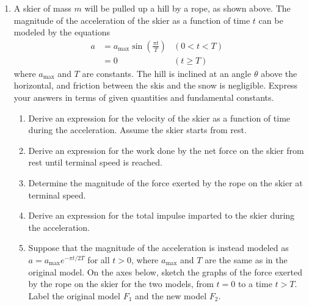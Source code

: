 \documentclass{../../../oss-apphys}
\begin{document}
\begin{center}
  \end{center}
\begin{enumerate}[leftmargin=15pt]
\item A skier of mass $m$ will be pulled up a hill by a rope, as shown above.
  The magnitude of the acceleration of the skier as a function of time $t$ can
  be modeled by the equations
  \begin{align*}
    a &=a_{\text{max}}\sin\left(\frac{\pi t}{T}\right)  &(0<t<T)&\\
    &=0 & (t\geq T)&
  \end{align*}
  where $a_{\text{max}}$ and $T$ are constants. The hill is inclined at an angle
  $\theta$ above the horizontal, and friction between the skis and the snow is
  negligible. Express your answers in terms of given quantities and fundamental
  constants.
  \begin{enumerate}[leftmargin=15pt]
  \item  Derive an expression for the velocity of the skier as a function of
    time during the acceleration. Assume the skier starts from rest.
    \vspace{1.2in}
  \item Derive an expression for the work done by the net force on the skier
    from rest until terminal speed is reached.
    \vspace{1.2in}
  \item Determine the magnitude of the force exerted by the rope on the skier
    at terminal speed.
    \vspace{1.2in}
  \item Derive an expression for the total impulse imparted to the skier during
    the acceleration.
    \vspace{1.2in}
  \item Suppose that the magnitude of the acceleration is instead modeled as
    $a=a_{\text{max}}e^{-\pi t/2T}$ for all $t > 0$, where $a_{\text{max}}$ and $T$
    are the same as in the original model. On the axes below, sketch the graphs
    of the force exerted by the rope on the skier for the two models, from
    $t=0$ to a time $t>T$. Label the original model $F_1$ and the new model
    $F_2$.
    \begin{center}
    \end{center}
  \end{enumerate}
  

\end{enumerate}
\end{document}
